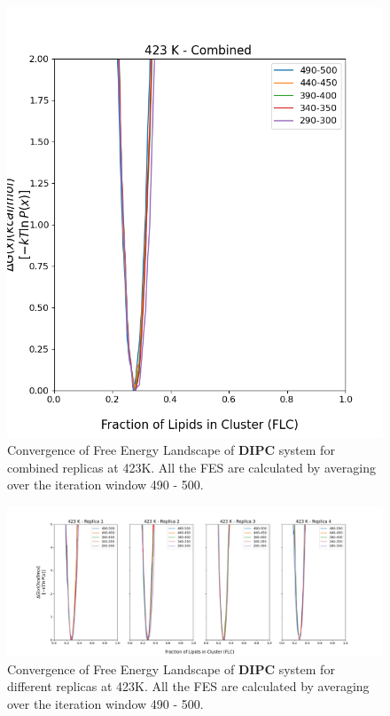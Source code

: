 \documentclass{biophys-new}
\begin{document}
\begin{figure}[hbt!]
\centering
\includegraphics[width=0.6\linewidth]{all_plots/ClusterLipids2Total/DPPC_DIPC_CHOL/423K/Convergence_DIPC_MULTI__423_ClusterLipids2Total.png}
\caption{Convergence of Free Energy Landscape of \textbf{DIPC} system for combined replicas at 423K. All the FES are calculated by averaging over the iteration window 490 - 500.}
\label{fig:view}

\end{figure}

\begin{figure}[hbt!]
\centering
\includegraphics[width=1.1\linewidth]{all_plots/ClusterLipids2Total/DPPC_DIPC_CHOL/423K/Convergence_DIPC_423_ClusterLipids2Total.png}
\caption{Convergence of Free Energy Landscape of \textbf{DIPC} system for different replicas at 423K. All the FES are calculated by averaging over the iteration window 490 - 500.}
\label{fig:view}

\end{figure}
\end{document}
